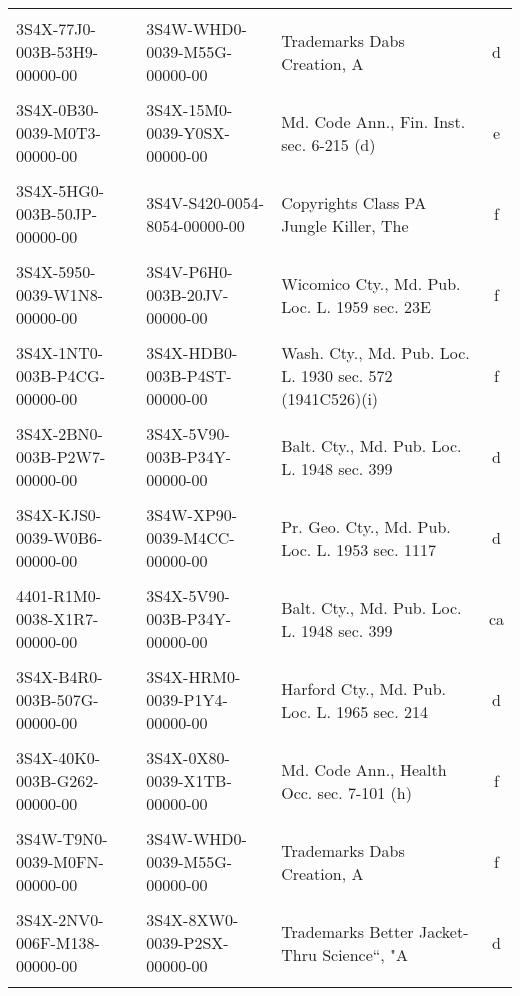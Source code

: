 \documentclass[10pt, letterpaper]{article}
\begin{document}
\begin{spacing}{1.0}
\begin{table}[H]
\begin{adjustwidth}{-0.225in}{}
\begin{tabular}{llp{2in}c}
            & & &\\[-6pt]
            3S4X-77J0-003B-53H9-00000-00 & 3S4W-WHD0-0039-M55G-00000-00 & Trademarks Dabs Creation, A & d\\
            & & &\\[-6pt]
            3S4X-0B30-0039-M0T3-00000-00 & 3S4X-15M0-0039-Y0SX-00000-00 & Md. Code Ann., Fin. Inst. sec. 6-215 (d) & e\\
            & & &\\[-6pt]
            3S4X-5HG0-003B-50JP-00000-00 & 3S4V-S420-0054-8054-00000-00 & Copyrights Class PA Jungle Killer, The & f\\
            & & &\\[-6pt]
            3S4X-5950-0039-W1N8-00000-00 & 3S4V-P6H0-003B-20JV-00000-00 & Wicomico Cty., Md. Pub. Loc. L. 1959 sec. 23E & f\\
            & & &\\[-6pt]
            3S4X-1NT0-003B-P4CG-00000-00 & 3S4X-HDB0-003B-P4ST-00000-00 & Wash. Cty., Md. Pub. Loc. L. 1930 sec. 572 (1941C526)(i) & f\\
            & & &\\[-6pt]
            3S4X-2BN0-003B-P2W7-00000-00 & 3S4X-5V90-003B-P34Y-00000-00 & Balt. Cty., Md. Pub. Loc. L. 1948 sec. 399 & d\\
            & & &\\[-6pt]
            3S4X-KJS0-0039-W0B6-00000-00 & 3S4W-XP90-0039-M4CC-00000-00 & Pr. Geo. Cty., Md. Pub. Loc. L. 1953 sec. 1117 & d\\
            & & &\\[-6pt]
            4401-R1M0-0038-X1R7-00000-00 & 3S4X-5V90-003B-P34Y-00000-00 & Balt. Cty., Md. Pub. Loc. L. 1948 sec. 399 & ca\\
            & & &\\[-6pt]
            3S4X-B4R0-003B-507G-00000-00 & 3S4X-HRM0-0039-P1Y4-00000-00 & Harford Cty., Md. Pub. Loc. L. 1965 sec. 214 & d\\
            & & &\\[-6pt]
            3S4X-40K0-003B-G262-00000-00 & 3S4X-0X80-0039-X1TB-00000-00 & Md. Code Ann., Health Occ. sec. 7-101 (h) & f\\
            & & &\\[-6pt]
            3S4W-T9N0-0039-M0FN-00000-00 & 3S4W-WHD0-0039-M55G-00000-00 & Trademarks Dabs Creation, A & f\\
            & & &\\[-6pt]
            3S4X-2NV0-006F-M138-00000-00 & 3S4X-8XW0-0039-P2SX-00000-00 & Trademarks Better Jacket-Thru Science``, "A & d\\[4pt]
            \hline\\[-6pt]
        \end{tabular}
        \label{tab:exCitationInValid}
    \end{adjustwidth}
\end{table}


\end{spacing}
\end{document}
